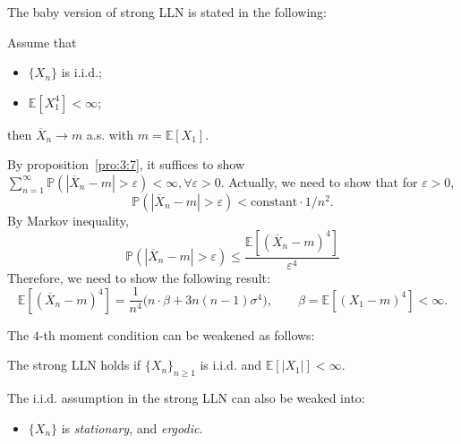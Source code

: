 The baby version of strong LLN is stated in the following:
\begin{theorem}
Assume that 
\begin{itemize}
\item
$\{X_n\}$ is i.i.d.;
\item
$\mathbb{E}[X_1^4]<\infty$;
\end{itemize}
then $\overline{X}_n\to m$ a.s. with $m=\mathbb{E}[X_1]$.
\end{theorem}
By proposition~\ref{pro:3:7}, it suffices to show $\sum_{n=1}^\infty \mathbb{P}(|\overline{X}_n- m|>\varepsilon)<\infty,\forall\varepsilon>0$.
Actually, we need to show that for $\varepsilon>0$,
\[
\mathbb{P}(|\overline{X}_n- m|>\varepsilon)<\text{constant}\cdot1/n^2.
\]
By Markov inequality,
\[
\mathbb{P}(|\overline{X}_n- m|>\varepsilon)\le\frac{\mathbb{E}[(\overline{X}_n- m)^4]}{\varepsilon^4}
\]
Therefore, we need to show the following result:
\[
\mathbb{E}[(\overline{X}_n- m)^4]
=
\frac{1}{n^4}\bigg(
n\cdot\beta + 3n(n-1)\sigma^4
\bigg),\qquad\beta = \mathbb{E}[(X_1-m)^4]<\infty.
\]

The $4$-th moment condition can be weakened as follows:
\begin{theorem}
The strong LLN holds if $\{X_n\}_{n\ge1}$ is i.i.d. and $\mathbb{E}[|X_1|]<\infty$.
\end{theorem}
\begin{remark}
The i.i.d. assumption in the strong LLN can also be weaked into:
\begin{itemize}
\item
$\{X_n\}$ is \emph{stationary}, and \emph{ergodic}.
\end{itemize}
\end{remark}

























